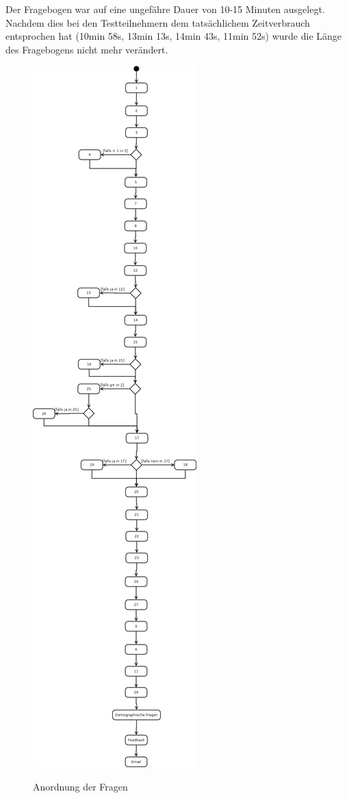 Der Fragebogen war auf eine ungefähre Dauer von 10-15 Minuten ausgelegt. Nachdem dies bei den Testteilnehmern dem tatsächlichem Zeitverbrauch entsprochen hat (10min 58s, 13min 13s, 14min 43s, 11min 52s) wurde die Länge des Fragebogens nicht mehr verändert.
\begin{figure}[H]
\centering
\includegraphics[height=\textheight]{images/umldia}\\
\caption{Anordnung der Fragen}\label{umldia}
\end{figure}


